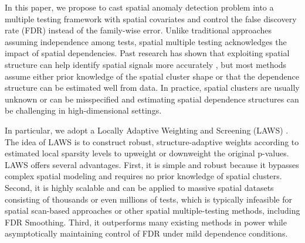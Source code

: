 \documentclass[11pt]{article}
\begin{document}
In this paper, we propose to cast spatial anomaly detection problem into a multiple testing framework with spatial covariates and control the false discovery rate (FDR) \citep{benjamini1995controlling} instead of the family-wise error. Unlike traditional approaches assuming independence among tests, spatial multiple testing acknowledges the impact of spatial dependencies. Past research has shown that exploiting spatial structure can help identify spatial signals more accurately \citep[see, e.g.,][]{benjamini2007false, sun2015false,lei2018adapt}, but most methods assume either prior knowledge of the spatial cluster shape or that the dependence structure can be estimated well from data. In practice, spatial clusters are usually unknown or can be misspecified and estimating spatial dependence structures can be challenging in high-dimensional settings.

In particular, we adopt a Locally Adaptive Weighting and Screening (LAWS) \citep{cai2022laws}. The idea of LAWS is to construct robust, structure-adaptive weights according to estimated local sparsity levels to upweight or downweight the original p-values. LAWS offers several advantages. First, it is simple and robust because it bypasses complex spatial modeling and requires no prior knowledge of spatial clusters. Second, it is highly scalable and can be applied to massive spatial datasets consisting of thousands or even millions of tests, which is typically infeasible for spatial scan-based approaches or other spatial multiple-testing methods, including FDR Smoothing. Third, it outperforms many existing methods in power while asymptotically maintaining control of FDR under mild dependence conditions.
\end{document}
